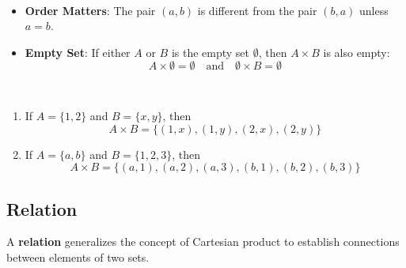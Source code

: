 \vspace{12pt}
\begin{note}[Properties]
\ \begin{itemize}
	\item \textbf{Order Matters}: The pair \((a, b)\) is different from the pair \((b, a)\) unless \(a = b\).
	\item \textbf{Empty Set}: If either \(A\) or \(B\) is the empty set \(\emptyset\), then \(A \times B\) is also empty:
	\[
	A \times \emptyset = \emptyset \quad \text{and} \quad \emptyset \times B = \emptyset
	\]
\end{itemize}
\end{note}
\begin{example}
\ \begin{enumerate}
	\item If \( A = \{1, 2\} \) and \( B = \{x, y\} \), then
	\[
	A \times B = \{ (1, x), (1, y), (2, x), (2, y) \}
	\]
	
	\item If \( A = \{a, b\} \) and \( B = \{1, 2, 3\} \), then
	\[
	A \times B = \{ (a, 1), (a, 2), (a, 3), (b, 1), (b, 2), (b, 3) \}
	\]
\end{enumerate}
\end{example}

\subsection*{Relation}

A \textbf{relation} generalizes the concept of Cartesian product to establish connections between elements of two sets.

